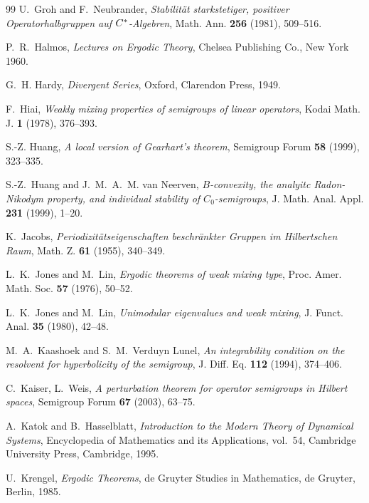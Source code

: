\documentclass[11pt,intlimits, draft,oneside]{amsart}
\theoremstyle{definition}
\begin{document}
\begin{thebibliography}{99}
U.~Groh and F.~Neubrander, %
\textit{Stabilit\"at starkstetiger, positiver {O}peratorhalbgruppen auf {$C\sp{\ast} $}-{A}lgebren}, %
Math. Ann. \textbf{256} (1981), 509--516. %


P.~R.~Halmos, %
\textit{Lectures on {E}rgodic {T}heory}, %
Chelsea Publishing Co., New York 1960. %


G.~H. Hardy, %
\textit{Divergent {S}eries}, %
Oxford, Clarendon Press, 1949. %


F.~Hiai, %
\textit{Weakly mixing properties of semigroups of linear operators}, %
Kodai Math. J.  \textbf{1}  (1978), 376--393. %


S.-Z. Huang, %
\textit{A local version of {G}earhart's theorem}, %
Semigroup Forum \textbf{58} (1999), 323--335. %


S.-Z.~Huang and J.~M.~A.~M. van Neerven, %
\textit{$B$-convexity, the analyitc {R}adon-{N}ikodym property, and individual stability of $C_0$-semigroups}, %
J. Math. Anal. Appl. \textbf{231} (1999), 1--20. %


K.~Jacobs, %
\textit{Periodizit\"atseigenschaften beschr\"ankter {G}ruppen im {H}ilbertschen {R}aum}, %
Math. Z. \textbf{61} (1955), 340--349. %


L.~K.~Jones and M.~Lin, %
\textit{Ergodic theorems of weak mixing type}, %
Proc. Amer. Math. Soc.  \textbf{57} (1976), 50--52. %


%
L.~K.~Jones and M.~Lin, %
\textit{Unimodular eigenvalues and weak mixing}, %
J. Funct. Anal.  \textbf{35} (1980), 42--48. %


M.~A.~Kaashoek and S.~M.~Verduyn Lunel, %
\textit{An integrability condition on the resolvent for hyperbolicity of the semigroup}, %
J. Diff. Eq. \textbf{112} (1994), 374--406. %


C.~Kaiser, L.~Weis, %
\textit{A perturbation theorem for operator semigroups in {H}ilbert spaces}, %
Semigroup Forum \textbf{67} (2003), 63--75. %


A.~Katok and B.~Hasselblatt, %
\textit{Introduction to the {M}odern {T}heory of {D}ynamical {S}ystems}, %
Encyclopedia of Mathematics and its Applications, vol.~54, Cambridge University Press, Cambridge, 1995. %


U.~Krengel, %
\textit{Ergodic {T}heorems}, %
de Gruyter Studies in Mathematics, de Gruyter, Berlin, 1985. %



\end{thebibliography}
\end{document}
